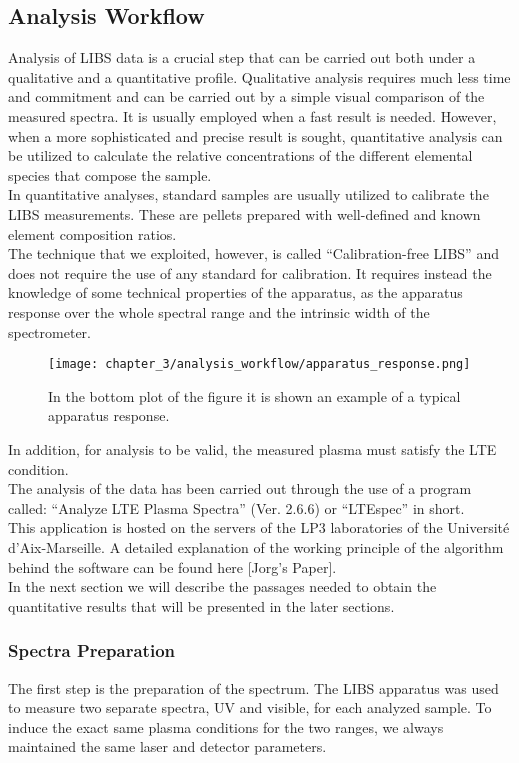 \subsection{Analysis Workflow}
\label{subsec:analysis_workflow}
Analysis of LIBS data is a crucial step that can be carried out both under a qualitative and a quantitative profile. Qualitative analysis requires much less time and commitment and can be carried out by a simple visual comparison of the measured spectra. It is usually employed when a fast result is needed. However, when a more sophisticated and precise result is sought, quantitative analysis can be utilized to calculate the relative concentrations of the different elemental species that compose the sample.
\\
In quantitative analyses, standard samples are usually utilized to calibrate the LIBS measurements. These are pellets prepared with well-defined and known element composition ratios.
\\
The technique that we exploited, however, is called “Calibration-free LIBS” and does not require the use of any standard for calibration. It requires instead the knowledge of some technical properties of the apparatus, as the apparatus response over the whole spectral range and the intrinsic width of the spectrometer.
\begin{figure}[H]
    \centering
    \texttt{[image: chapter\_3/analysis\_workflow/apparatus\_response.png]} 
    \caption{In the bottom plot of the figure it is shown an example of a typical apparatus response. }
    \label{fig:apparatus_response}
\end{figure}
In addition, for analysis to be valid, the measured plasma must satisfy the LTE condition.
\\
The analysis of the data has been carried out through the use of a program called: “Analyze LTE Plasma Spectra” (Ver. 2.6.6) or “LTEspec” in short.
\\
This application is hosted on the servers of the LP3 laboratories of the Université d’Aix-Marseille. A detailed explanation of the working principle of the algorithm behind the software can be found here [Jorg’s Paper].
\\
In the next section we will describe the passages needed to obtain the quantitative results that will be presented in the later sections.
\subsubsection{Spectra Preparation}
\label{subsubsec:spectra_preparation}
The first step is the preparation of the spectrum. The LIBS apparatus was used to measure two separate spectra, UV and visible, for each analyzed sample. To induce the exact same plasma conditions for the two ranges, we always maintained the same laser and detector parameters.


